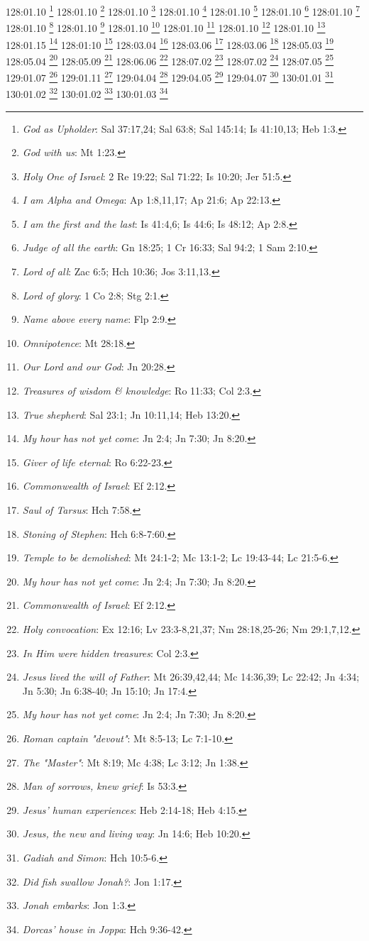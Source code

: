{{{{{{{{{{{{128:01.10 \footnote{\textit{God as Upholder}: Sal 37:17,24; Sal 63:8; Sal 145:14; Is 41:10,13; Heb 1:3.}
128:01.10 \footnote{\textit{God with us}: Mt 1:23.}
128:01.10 \footnote{\textit{Holy One of Israel}: 2 Re 19:22; Sal 71:22; Is 10:20; Jer 51:5.}
128:01.10 \footnote{\textit{I am Alpha and Omega}: Ap 1:8,11,17; Ap 21:6; Ap 22:13.}
128:01.10 \footnote{\textit{I am the first and the last}: Is 41:4,6; Is 44:6; Is 48:12; Ap 2:8.}
128:01.10 \footnote{\textit{Judge of all the earth}: Gn 18:25; 1 Cr 16:33; Sal 94:2; 1 Sam 2:10.}
128:01.10 \footnote{\textit{Lord of all}: Zac 6:5; Hch 10:36; Jos 3:11,13.}
128:01.10 \footnote{\textit{Lord of glory}: 1 Co 2:8; Stg 2:1.}
128:01.10 \footnote{\textit{Name above every name}: Flp 2:9.}
128:01.10 \footnote{\textit{Omnipotence}: Mt 28:18.}
128:01.10 \footnote{\textit{Our Lord and our God}: Jn 20:28.}
128:01.10 \footnote{\textit{Treasures of wisdom & knowledge}: Ro 11:33; Col 2:3.}
128:01.10 \footnote{\textit{True shepherd}: Sal 23:1; Jn 10:11,14; Heb 13:20.}
128:01.15 \footnote{\textit{My hour has not yet come}: Jn 2:4; Jn 7:30; Jn 8:20.}
128:01:10 \footnote{\textit{Giver of life eternal}: Ro 6:22-23.}
128:03.04 \footnote{\textit{Commonwealth of Israel}: Ef 2:12.}
128:03.06 \footnote{\textit{Saul of Tarsus}: Hch 7:58.}
128:03.06 \footnote{\textit{Stoning of Stephen}: Hch 6:8-7:60.}
128:05.03 \footnote{\textit{Temple to be demolished}: Mt 24:1-2; Mc 13:1-2; Lc 19:43-44; Lc 21:5-6.}
128:05.04 \footnote{\textit{My hour has not yet come}: Jn 2:4; Jn 7:30; Jn 8:20.}
128:05.09 \footnote{\textit{Commonwealth of Israel}: Ef 2:12.}
128:06.06 \footnote{\textit{Holy convocation}: Ex 12:16; Lv 23:3-8,21,37; Nm 28:18,25-26; Nm 29:1,7,12.}
128:07.02 \footnote{\textit{In Him were hidden treasures}: Col 2:3.}
128:07.02 \footnote{\textit{Jesus lived the will of Father}: Mt 26:39,42,44; Mc 14:36,39; Lc 22:42; Jn 4:34; Jn 5:30; Jn 6:38-40; Jn 15:10; Jn 17:4.}
128:07.05 \footnote{\textit{My hour has not yet come}: Jn 2:4; Jn 7:30; Jn 8:20.}
129:01.07 \footnote{\textit{Roman captain "devout"}: Mt 8:5-13; Lc 7:1-10.}
129:01.11 \footnote{\textit{The "Master"}: Mt 8:19; Mc 4:38; Lc 3:12; Jn 1:38.}
129:04.04 \footnote{\textit{Man of sorrows, knew grief}: Is 53:3.}
129:04.05 \footnote{\textit{Jesus' human experiences}: Heb 2:14-18; Heb 4:15.}
129:04.07 \footnote{\textit{Jesus, the new and living way}: Jn 14:6; Heb 10:20.}
130:01.01 \footnote{\textit{Gadiah and Simon}: Hch 10:5-6.}
130:01.02 \footnote{\textit{Did fish swallow Jonah?}: Jon 1:17.}
130:01.02 \footnote{\textit{Jonah embarks}: Jon 1:3.}
130:01.03 \footnote{\textit{Dorcas' house in Joppa}: Hch 9:36-42.}
}}}}}}}}}}}}
